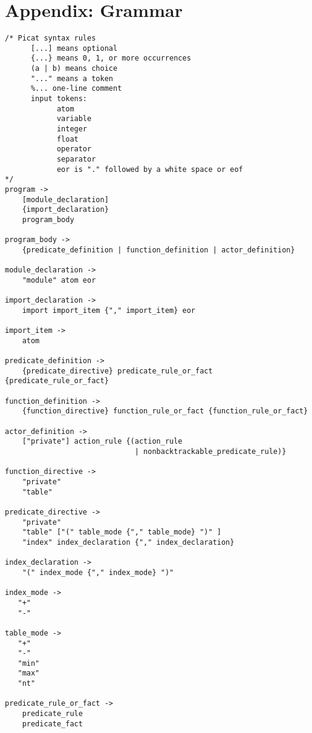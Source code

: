 
\chapter{\label{chapter:syntax}Appendix: Grammar}
\begin{scriptsize}
\begin{verbatim}
/* Picat syntax rules 
      [...] means optional
      {...} means 0, 1, or more occurrences
      (a | b) means choice
      "..." means a token
      %... one-line comment
      input tokens:
            atom
            variable
            integer
            float
            operator
            separator
            eor is "." followed by a white space or eof
*/
program ->
    [module_declaration]
    {import_declaration}
    program_body

program_body ->
    {predicate_definition | function_definition | actor_definition}

module_declaration -> 
    "module" atom eor

import_declaration ->
    import import_item {"," import_item} eor

import_item ->
    atom 

predicate_definition ->
    {predicate_directive} predicate_rule_or_fact {predicate_rule_or_fact}

function_definition ->
    {function_directive} function_rule_or_fact {function_rule_or_fact}

actor_definition ->
    ["private"] action_rule {(action_rule 
                              | nonbacktrackable_predicate_rule)}

function_directive ->
    "private"
    "table"

predicate_directive ->
    "private"
    "table" ["(" table_mode {"," table_mode} ")" ]
    "index" index_declaration {"," index_declaration}

index_declaration ->
    "(" index_mode {"," index_mode} ")"

index_mode ->
   "+"
   "-"
   
table_mode ->
   "+"
   "-"
   "min"
   "max"
   "nt"
      
predicate_rule_or_fact ->
    predicate_rule
    predicate_fact


\end{verbatim}
\end{scriptsize}
